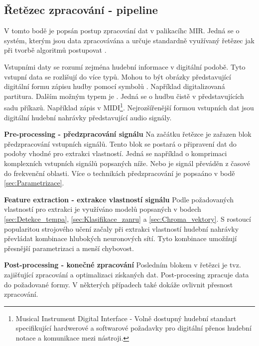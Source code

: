    \subsection{Řetězec zpracování - pipeline}

    V tomto bodě je popsán postup zpracování dat v palikacíhc \acs{MIR}.
    Jedná se o systém, kterým jsou data zpracovávána a určuje standardně využívaný řetězec jak při tvorbě algoritmů postupovat .
    
    Vstupními daty se rozumí zejména hudební informace v digitální podobě.
    Tyto vstupní data se rozlišují do více typů. Mohou to být obrázky představující digitální formu zápisu hudby pomocí symbolů \cite{a_new_companion_to_digital_humanities}.
    Například digitalizovaná partitura.
    Dalším možným typem je .
    Jedná se o hudbu čistě v  představujících sadu příkazů.
    Například zápis v \acs{MIDI}\footnote{Musical Instrument Digital Interface -
    Volně dostupný hudební standart specifikující hardwerové a softwarové požadavky pro digitální přenos hudební notace a komunikace mezi nástroji.\cite{wiki:MIDI}}.
    Nejrozšířenější formou vstupních dat jsou digitální hudební nahrávky představující audio signály.

    \textbf{Pre-processing - předzpracování signálu}
    Na začátku řetězce je zařazen blok předzpracování vstupních signálů.
    Tento blok se postará o připravení dat do podoby vhodné pro extrakci vlastností.
    Jedná se například o komprimaci komplexních vstupních signálů popsaných níže.
    Nebo je signál převáděn z časové do frekvenční oblasti.
    Více o technikách předzpracování je popsaáno v bodě \ref{sec:Parametrizace}.

    \textbf{Feature extraction - extrakce vlastností signálu}
    Podle požadovaných vlastností pro extrakci je využíváno modelů popsaných v bodech \ref{sec:Detekce_tempa}, \ref{sec:Klasifikace_zanru} a \ref{sec:Chroma_vektory}.
    S rostoucí popularitou strojového učení začaly při extrakci vlastností hudební nahrávky převládat kombinace hlubokých neuronových sítí.
    Tyto kombinace umožňují přesnější parametrizaci a menší chybovost.

    \textbf{Post-processing - konečné zpracování}
    Posledním blokem v řetězci je tvz.  zajišťující zpracování a optimalizaci získaných dat.
    Post-procesing zpracuje data do požadované formy. V některých případech také dokáže ovlivnit přesnost zpracování.

